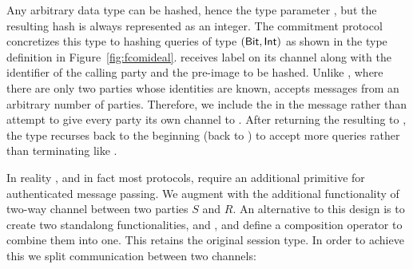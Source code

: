 
Any arbitrary data type can be hashed, hence the type parameter , but the resulting hash is always represented as an integer. 
The commitment protocol concretizes this type to hashing queries of type $\mathsf{(Bit,Int)}$ as shown in the type definition \protcom in Figure~\ref{fig:fcomideal}.
\Fro receives label  on its channel along with the identifier of the calling party and the pre-image to be hashed. 
Unlike \Fcom, where there are only two parties whose identities are known, \Fro accepts messages from an arbitrary number of parties.
Therefore, we include the  in the message rather than attempt to give every party its own channel to \Fro.
After returning the resulting  to , the type recurses back to the beginning (back to ) to accept more queries rather than terminating like \Fcom.

In reality \protcom, and in fact most protocols, require an additional primitive for authenticated message passing.
We augment \Fro with the additional functionality of two-way channel between two parties $S$ and $R$. 
An alternative to this design is to create two standalong functionalities, \Fro and \Fchan, and define a composition operator to combine them into one. 
This retains the original  session type. 
In order to achieve this we split communication between two channels:

